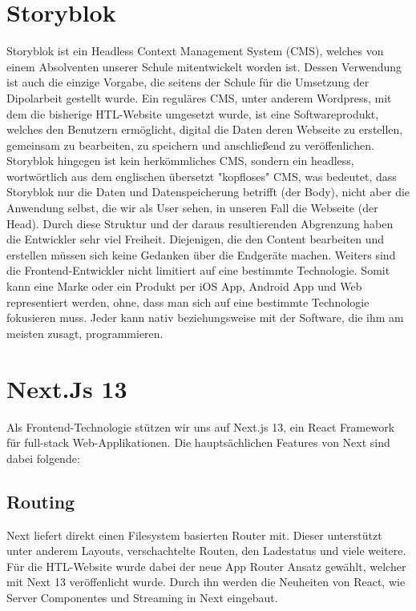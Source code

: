 \section{Storyblok}

Storyblok ist ein Headless Context Management System (CMS), welches von einem Absolventen unserer Schule mitentwickelt worden ist.
Dessen Verwendung ist auch die einzige Vorgabe, die seitens der Schule für die Umsetzung der Dipolarbeit gestellt wurde. 
Ein reguläres CMS, unter anderem Wordpress, mit dem die bisherige HTL-Website umgesetzt wurde, ist eine Softwareprodukt, 
welches den Benutzern ermöglicht, digital die Daten deren Webseite zu erstellen, gemeinsam zu bearbeiten, zu speichern 
und anschließend zu veröffenlichen.
Storyblok hingegen ist kein herkömmliches CMS, sondern ein headless, wortwörtlich aus dem englischen übersetzt "kopfloses" CMS, 
was bedeutet, dass Storyblok nur die Daten und Datenspeicherung betrifft (der Body), nicht aber die Anwendung selbst, die wir als User sehen, in unseren Fall die Webseite (der Head).
Durch diese Struktur und der daraus resultierenden Abgrenzung haben die Entwickler sehr viel Freiheit. Diejenigen, die den Content bearbeiten und erstellen müssen sich keine Gedanken über die Endgeräte machen.
Weiters sind die Frontend-Entwickler nicht limitiert auf eine bestimmte Technologie. Somit kann eine Marke oder ein Produkt per iOS App, Android App und Web representiert werden, ohne, 
dass man sich auf eine bestimmte Technologie fokusieren muss. Jeder kann nativ beziehungsweise mit der Software, die ihm am meisten zusagt, programmieren. \cite{storyblok}
\section{Next.Js 13}
Als Frontend-Technologie stützen wir uns auf Next.js 13, ein React Framework für full-stack Web-Applikationen. \cite{nextjsdocs}
Die hauptsächlichen Features von Next sind dabei folgende:

\subsection{Routing}
Next liefert direkt einen Filesystem basierten Router mit. Dieser unterstützt unter anderem Layouts, verschachtelte Routen, den Ladestatus und viele weitere.
Für die HTL-Website wurde dabei der neue App Router Ansatz gewählt, welcher mit Next 13 veröffenlicht wurde. Durch ihn werden die Neuheiten von React, wie Server Componentes und Streaming in Next eingebaut. \cite{nextjsdocsrouting}

